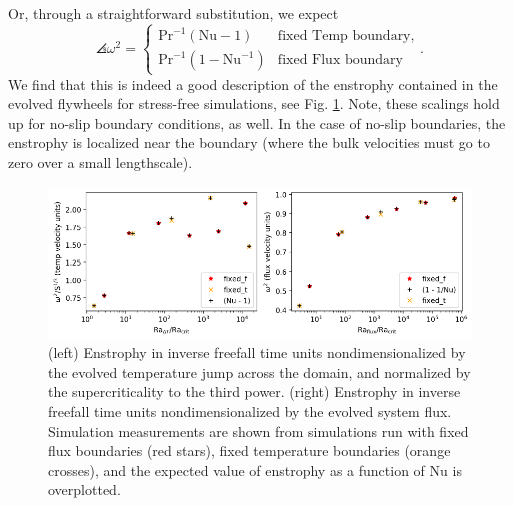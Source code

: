 Or, through a straightforward substitution, we expect
\begin{equation}
\angles{\omega^2} = 
\begin{cases}
\text{Pr}^{-1} (\text{Nu} - 1)  & \text{fixed Temp boundary}, \\
\text{Pr}^{-1} (1 - \text{Nu}^{-1}) & \text{fixed Flux boundary}
\end{cases}.
\end{equation}
We find that this is indeed a good description of the enstrophy contained in the evolved flywheels for stress-free simulations, see Fig. \ref{fig:enstrophy}.
Note, these scalings hold up for no-slip boundary conditions, as well.
In the case of no-slip boundaries, the enstrophy is localized near the boundary (where the bulk velocities must go to zero over a small lengthscale).

\begin{figure}[t!]
    \includegraphics[width=\textwidth]{figs/unpublished/enstrophy_v_ra.pdf}
    \caption[Evolved enstrophy in RBC simulations.]{
	(left) Enstrophy in inverse freefall time units nondimensionalized by the evolved temperature jump across the domain, and normalized by the supercriticality to the third power.
	(right) Enstrophy in inverse freefall time units nondimensionalized by the evolved system flux.
	Simulation measurements are shown from simulations run with fixed flux boundaries (red stars), fixed temperature boundaries (orange crosses), and the expected value of enstrophy as a function of Nu is overplotted.
    \label{fig:enstrophy} }
\end{figure}

